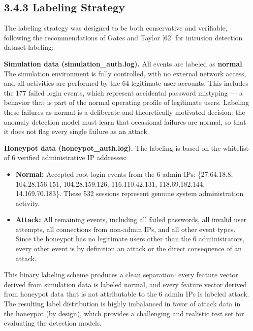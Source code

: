 \documentclass[
  a4paper]{report}
\providecommand{\tightlist}{%
  \setlength{\itemsep}{0pt}\setlength{\parskip}{0pt}}
\begin{document}
\subsection{3.4.3 Labeling Strategy}\label{labeling-strategy}

The labeling strategy was designed to be both conservative and
verifiable, following the recommendations of Gates and Taylor {[}62{]}
for intrusion detection dataset labeling:

\textbf{Simulation data (simulation\_auth.log).} All events are labeled
as \textbf{normal}. The simulation environment is fully controlled, with
no external network access, and all activities are performed by the 64
legitimate user accounts. This includes the 177 failed login events,
which represent accidental password mistyping --- a behavior that is
part of the normal operating profile of legitimate users. Labeling these
failures as normal is a deliberate and theoretically motivated decision:
the anomaly detection model must learn that occasional failures are
normal, so that it does not flag every single failure as an attack.

\textbf{Honeypot data (honeypot\_auth.log).} The labeling is based on
the whitelist of 6 verified administrative IP addresses:

\begin{itemize}
\tightlist
\item
  \textbf{Normal:} Accepted root login events from the 6 admin IPs:
  \{27.64.18.8, 104.28.156.151, 104.28.159.126, 116.110.42.131,
  118.69.182.144, 14.169.70.183\}. These 532 sessions represent genuine
  system administration activity.
\item
  \textbf{Attack:} All remaining events, including all failed passwords,
  all invalid user attempts, all connections from non-admin IPs, and all
  other event types. Since the honeypot has no legitimate users other
  than the 6 administrators, every other event is by definition an
  attack or the direct consequence of an attack.
\end{itemize}

This binary labeling scheme produces a clean separation: every feature
vector derived from simulation data is labeled normal, and every feature
vector derived from honeypot data that is not attributable to the 6
admin IPs is labeled attack. The resulting label distribution is highly
imbalanced in favor of attack data in the honeypot (by design), which
provides a challenging and realistic test set for evaluating the
detection models.
\end{document}
